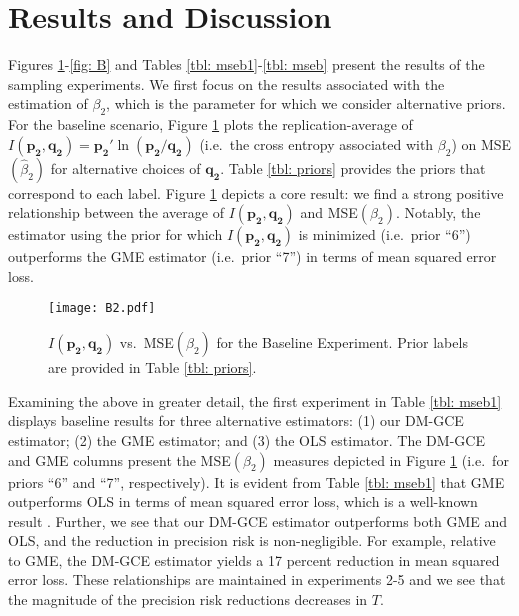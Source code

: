 \documentclass{elsarticle}
\begin{document}

\section{Results and Discussion}
\label{sec: results}

Figures \ref{fig: B1}-\ref{fig: B} and Tables \ref{tbl: mseb1}-\ref{tbl: mseb} 
present the results of the sampling experiments.
We first focus on the results associated with the estimation of $\beta_2$, which 
is the parameter for which we consider alternative priors.
For the baseline scenario, Figure \ref{fig: B1} plots the replication-average of 
$I(\mathbf{p_2}, \mathbf{q_2}) = \mathbf{p_2}'\ln (\mathbf{p_2}/
\mathbf{q_2})$ (i.e.\ the cross entropy associated with $\beta_2$) on 
MSE$(\hat{\beta}_2)$  for alternative choices of $\mathbf{q_2}$.
Table \ref{tbl: priors} provides the priors that correspond to each label.
Figure \ref{fig: B1} depicts a core result: we find a strong positive 
relationship between the average of $I(\mathbf{p_2}, \mathbf{q_2})$ 
and MSE$(\beta_2)$.
Notably, the estimator using the prior for which $I(\mathbf{p_2}, 
\mathbf{q_2})$ is minimized (i.e.\ prior ``6'') outperforms the GME 
estimator (i.e.\ prior ``7'') in terms of mean squared error loss.

\begin{figure}[htbp]
\centering
\texttt{[image: B2.pdf]}
\caption{$I(\mathbf{p_2}, \mathbf{q_2})$ vs.\ MSE$(\hat{\beta}_2)$ 
for the Baseline Experiment. Prior labels are provided in Table \ref{tbl: priors}.}
\label{fig: B1}
\end{figure}

Examining the above in greater detail, the first experiment in Table 
\ref{tbl: mseb1} displays baseline results for three alternative estimators: 
(1) our DM-GCE estimator; (2) the GME estimator; and (3) the OLS 
estimator.
The DM-GCE and GME columns present the MSE$(\beta_2)$ measures 
depicted in Figure \ref{fig: B1} (i.e.\ for priors ``6'' and ``7'', respectively).
It is evident from Table \ref{tbl: mseb1} that GME outperforms OLS in 
terms of mean squared error loss, which is a well-known result 
\citep{golan1996}. 
Further, we see that our DM-GCE estimator outperforms both GME and OLS,
and the reduction in precision risk is non-negligible.
For example, relative to GME, the DM-GCE estimator yields a 17 percent 
reduction in mean squared error loss.
These relationships are maintained in experiments 2-5 and we see that 
the magnitude of the precision risk reductions decreases in $T$.
\end{document}
